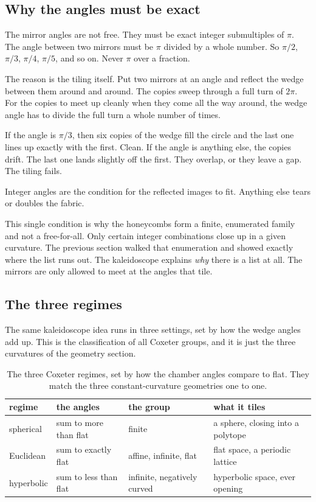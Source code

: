 \subsection{Why the angles must be exact}

The mirror angles are not free. They must be exact integer submultiples of $\pi$. The angle between two mirrors must be $\pi$ divided by a whole number. So $\pi/2$, $\pi/3$, $\pi/4$, $\pi/5$, and so on. Never $\pi$ over a fraction.

The reason is the tiling itself. Put two mirrors at an angle and reflect the wedge between them around and around. The copies sweep through a full turn of $2\pi$. For the copies to meet up cleanly when they come all the way around, the wedge angle has to divide the full turn a whole number of times.

If the angle is $\pi/3$, then six copies of the wedge fill the circle and the last one lines up exactly with the first. Clean. If the angle is anything else, the copies drift. The last one lands slightly off the first. They overlap, or they leave a gap. The tiling fails.

\begin{principle}
Integer angles are the condition for the reflected images to fit. Anything else tears or doubles the fabric.
\end{principle}

This single condition is why the honeycombs form a finite, enumerated family and not a free-for-all. Only certain integer combinations close up in a given curvature. The previous section walked that enumeration and showed exactly where the list runs out. The kaleidoscope explains \emph{why} there is a list at all. The mirrors are only allowed to meet at the angles that tile.

\subsection{The three regimes}

The same kaleidoscope idea runs in three settings, set by how the wedge angles add up. This is the classification of all Coxeter groups, and it is just the three curvatures of the geometry section.

\begin{table}[ht]
\centering
\begin{tabular}{@{}llll@{}}
\toprule
regime & the angles & the group & what it tiles \\
\midrule
spherical & sum to more than flat & finite & a sphere, closing into a polytope \\
Euclidean & sum to exactly flat & affine, infinite, flat & flat space, a periodic lattice \\
hyperbolic & sum to less than flat & infinite, negatively curved & hyperbolic space, ever opening \\
\bottomrule
\end{tabular}
\caption{The three Coxeter regimes, set by how the chamber angles compare to flat. They match the three constant-curvature geometries one to one.}
\label{tab:three-regimes}
\end{table}

